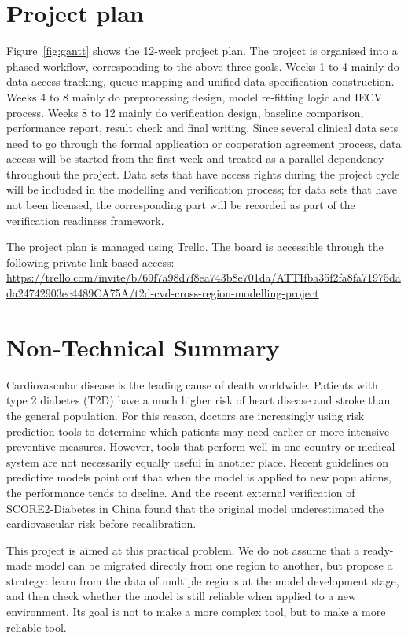 \documentclass[conference]{IEEEtran}
\begin{document}
\section{Project plan}
Figure~\ref{fig:gantt} shows the 12-week project plan. The project is organised into a phased workflow, corresponding to the above three goals. Weeks 1 to 4 mainly do data access tracking, queue mapping and unified data specification construction. Weeks 4 to 8 mainly do preprocessing design, model re-fitting logic and IECV process. Weeks 8 to 12 mainly do verification design, baseline comparison, performance report, result check and final writing. Since several clinical data sets need to go through the formal application or cooperation agreement process, data access will be started from the first week and treated as a parallel dependency throughout the project. Data sets that have access rights during the project cycle will be included in the modelling and verification process; for data sets that have not been licensed, the corresponding part will be recorded as part of the verification readiness framework.

The project plan is managed using Trello. The board is accessible through the following private link-based access: \url{https://trello.com/invite/b/69f7a98d7f8ea743b8e701da/ATTIfba35f2fa8fa71975dada24742903ec4489CA75A/t2d-cvd-cross-region-modelling-project}






\section{Non-Technical Summary}
Cardiovascular disease is the leading cause of death worldwide. Patients with type 2 diabetes (T2D) have a much higher risk of heart disease and stroke than the general population. For this reason, doctors are increasingly using risk prediction tools to determine which patients may need earlier or more intensive preventive measures. However, tools that perform well in one country or medical system are not necessarily equally useful in another place. Recent guidelines on predictive models point out that when the model is applied to new populations, the performance tends to decline. And the recent external verification of SCORE2-Diabetes in China found that the original model underestimated the cardiovascular risk before recalibration.

This project is aimed at this practical problem. We do not assume that a ready-made model can be migrated directly from one region to another, but propose a strategy: learn from the data of multiple regions at the model development stage, and then check whether the model is still reliable when applied to a new environment. Its goal is not to make a more complex tool, but to make a more reliable tool.
\end{document}
